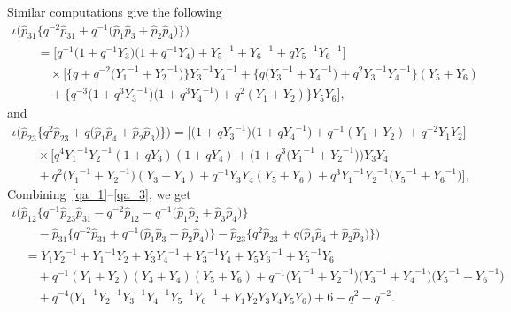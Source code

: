 \documentclass[10pt,a4paper]{amsart}
\numberwithin{equation}{section}
\begin{document}
Similar computations give the following
\begin{gather}
 \iota \big( \hat{p}_{31}\big\{ q^{-2} \hat{p}_{31} + q^{-1} \big( \hat{p}_1 \hat{p}_3 + \hat{p}_2 \hat{p}_4\big)\big\}\big)\nonumber \\
 \qquad{} = \big[ q^{-1} \big( 1 + q^{-1} Y_3\big)\big( 1 + q^{-1} Y_4\big) + {Y_5}^{-1} + {Y_6}^{-1} + q {Y_5}^{-1} {Y_6}^{-1}\big]\nonumber \\
 \qquad\quad{} \times \big[\big\{ q + q^{-2} \big( {Y_1}^{-1} + {Y_2}^{-1}\big)\big\} {Y_3}^{-1} {Y_4}^{-1} + \big\{ q\big( {Y_3}^{-1} + {Y_4}^{-1}\big) +q^2 {Y_3}^{-1} {Y_4}^{-1} \big\} ( Y_5 + Y_6 )\nonumber \\
\qquad\quad{} + \big\{ q^{-3}\big( 1 + q^3 {Y_3}^{-1}\big)\big( 1 + q^3 {Y_4}^{-1}\big) + q^2 ( Y_1 + Y_2 )\big\} Y_5 Y_6\big] , \label{qa_2}
\end{gather}
and
\begin{gather}
\iota\big( \hat{p}_{23}\big\{ q^2 \hat{p}_{23} + q\big( \hat{p}_1 \hat{p}_4 + \hat{p}_2 \hat{p}_3\big)\big\}\big) =
\big[ \big( 1 + q {Y_3}^{-1}\big)\big( 1 + q {Y_4}^{-1}\big) + q^{-1}( Y_1 + Y_2) + q^{-2} Y_1 Y_2\big]\nonumber \\
\qquad{} \times \big[ q^4 {Y_1}^{-1} {Y_2}^{-1} ( 1 + q Y_3 ) ( 1 + q Y_4 ) +\big( 1 + q^3\big( {Y_1}^{-1} + {Y_2}^{-1}\big)\big) Y_3 Y_4\nonumber \\
 \qquad{}+ q^2\big( {Y_1}^{-1} + {Y_2}^{-1}\big)( Y_3 + Y_4)+ q^{-1} Y_3 Y_4 ( Y_5 + Y_6 ) + q^3 {Y_1}^{-1} {Y_2}^{-1} \big( {Y_5}^{-1} + {Y_6}^{-1} \big)\big],\!\!\!\! \label{qa_3}
\end{gather}
Combining~\eqref{qa_1}--\eqref{qa_3}, we get
\begin{gather}
 \iota \big( \hat{p}_{12} \big\{ q^{-1} \hat{p}_{23} \hat{p}_{31} -q^{-2} \hat{p}_{12} - q^{-1} \big( \hat{p}_1 \hat{p}_2 + \hat{p}_3 \hat{p}_4\big) \big\}\nonumber \\
 \quad\quad{} - \hat{p}_{31} \big\{ q^{-2} \hat{p}_{31} + q^{-1} \big( \hat{p}_1 \hat{p}_3 + \hat{p}_2 \hat{p}_4 \big)\big\} - \hat{p}_{23} \big\{ q^2 \hat{p}_{23} + q \big( \hat{p}_1 \hat{p}_4 +
 \hat{p}_2 \hat{p}_3 \big) \big\} \big) \nonumber \\
 \quad{} = Y_1 {Y_2}^{-1} + {Y_1}^{-1} Y_2 + Y_3 {Y_4}^{-1} + {Y_3}^{-1} Y_4 + Y_5 {Y_6}^{-1} + {Y_5}^{-1} Y_6\nonumber \\
 \quad\quad {} + q^{-1} ( Y_1 + Y_2 ) ( Y_3 + Y_4)( Y_5 + Y_6) + q^{-1} \big( {Y_1}^{-1} + {Y_2}^{-1} \big) \big( {Y_3}^{-1} + {Y_4}^{-1}\big)\big( {Y_5}^{-1} + {Y_6}^{-1}\big)\nonumber \\
 \quad\quad {} + q^{-4} \big( {Y_1}^{-1} {Y_2}^{-1} {Y_3}^{-1} {Y_4}^{-1} {Y_5}^{-1} {Y_6}^{-1} + Y_1 Y_2 Y_3 Y_4 Y_5 Y_6\big) + 6 - q^2 - q^{-2} . \label{qa_4}
\end{gather}
\end{document}
